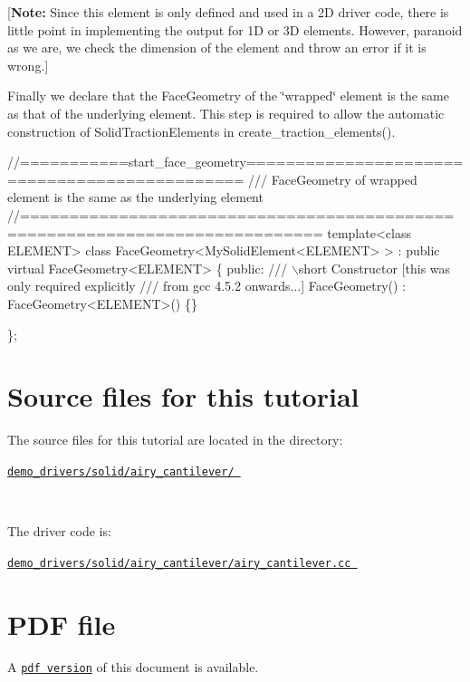 \mbox{[}{\bfseries Note\+:} Since this element is only defined and used in a 2D driver code, there is little point in implementing the output for 1D or 3D elements. However, paranoid as we are, we check the dimension of the element and throw an error if it is wrong.\mbox{]}

Finally we declare that the {\ttfamily Face\+Geometry} of the \char`\"{}wrapped\char`\"{} element is the same as that of the underlying element. This step is required to allow the automatic construction of {\ttfamily Solid\+Traction\+Elements} in {\ttfamily create\+\_\+traction\+\_\+elements()}.

 
\begin{DoxyCodeInclude}
\textcolor{comment}{//===========start\_face\_geometry==============================================}
\textcolor{comment}{/// FaceGeometry of wrapped element is the same as the underlying element}
\textcolor{comment}{}\textcolor{comment}{//============================================================================}
\textcolor{keyword}{template}<\textcolor{keyword}{class} ELEMENT>
\textcolor{keyword}{class }FaceGeometry<MySolidElement<ELEMENT> > :
 \textcolor{keyword}{public} \textcolor{keyword}{virtual} FaceGeometry<ELEMENT>
\{
\textcolor{keyword}{public}:
\textcolor{comment}{}
\textcolor{comment}{ /// \(\backslash\)short Constructor [this was only required explicitly}
\textcolor{comment}{ /// from gcc 4.5.2 onwards...]}
\textcolor{comment}{} FaceGeometry() : FaceGeometry<ELEMENT>() \{\}

\};

\end{DoxyCodeInclude}




 

\hypertarget{index_sources}{}\section{Source files for this tutorial}\label{index_sources}

\begin{DoxyItemize}
\item The source files for this tutorial are located in the directory\+:~\newline
~\newline
\begin{center} \href{
../../../../
demo_drivers/solid/airy_cantilever/
}{\tt demo\+\_\+drivers/solid/airy\+\_\+cantilever/ } \end{center} ~\newline

\item The driver code is\+: ~\newline
~\newline
\begin{center} \href{
../../../../
demo_drivers/solid/airy_cantilever/airy_cantilever.cc
}{\tt demo\+\_\+drivers/solid/airy\+\_\+cantilever/airy\+\_\+cantilever.\+cc } \end{center} 
\end{DoxyItemize}



 

 \hypertarget{index_pdf}{}\section{P\+D\+F file}\label{index_pdf}
A \href{../latex/refman.pdf}{\tt pdf version} of this document is available. 
